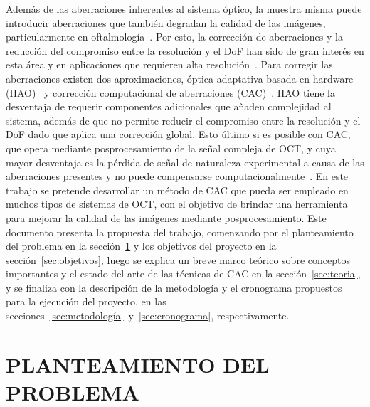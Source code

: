\documentclass[letter, 12 pt]{article}
\begin{document}
Además de las aberraciones inherentes al sistema óptico, la muestra misma puede introducir aberraciones que también degradan la calidad de las imágenes, particularmente en oftalmología~\cite{liang1994, thibos2002}. Por esto, la corrección de aberraciones y la reducción del compromiso entre la resolución y el DoF han sido de gran interés en esta área y en aplicaciones que requieren alta resolución~\cite{pircher2017}. Para corregir las aberraciones existen dos aproximaciones, óptica adaptativa basada en hardware (HAO)~\cite{Pircher2007_Combining,felberer2014} y corrección computacional de aberraciones (CAC)~\cite{yasuno2006,ralston2007}. HAO tiene la desventaja de requerir componentes adicionales que añaden complejidad al sistema, además de que no permite reducir el compromiso entre la resolución y el DoF dado que aplica una corrección global. Esto último si es posible con CAC, que opera mediante posprocesamiento de la señal compleja de OCT, y cuya mayor desventaja es la pérdida de señal de naturaleza experimental a causa de las aberraciones presentes y no puede compensarse computacionalmente~\cite{liu2017}. En este trabajo se pretende desarrollar un método de CAC que pueda ser empleado en muchos tipos de sistemas de OCT, con el objetivo de brindar una herramienta para mejorar la calidad de las imágenes mediante posprocesamiento. Este documento presenta la propuesta del trabajo, comenzando por el planteamiento del problema en la sección~\ref{sec:planteamiento} y los objetivos del proyecto en la sección~\ref{sec:objetivos}, luego se explica un breve marco teórico sobre conceptos importantes y el estado del arte de las técnicas de CAC en la sección~\ref{sec:teoria}, y se finaliza con la descripción de la metodología y el cronograma propuestos para la ejecución del proyecto, en las secciones~\ref{sec:metodología}~y~\ref{sec:cronograma}, respectivamente.


\section{PLANTEAMIENTO DEL PROBLEMA} \label{sec:planteamiento}
\end{document}
